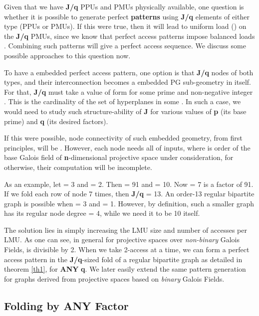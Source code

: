 \documentclass[12pt]{article}
\begin{document}
Given that we have \textbf{J/q} PPUs and PMUs physically available, one
question is whether it is possible to generate perfect
\textbf{patterns} using \textbf{J/q} elements of either type (PPUs or PMUs). If this were true, then it will lead to uniform
load () on the \textbf{J/q} PMUs, since we know that perfect access patterns
impose balanced loads \cite{karm1}. Combining such patterns
will give a perfect access sequence. We discuss some possible
approaches to this question now.

To have a embedded perfect access pattern, one option is that \textbf{J/q} nodes of both
types, and their interconnection becomes a embedded PG sub-geometry in
itself. For that, 
\textbf{J/q} must take a value of
form {\large } for some
prime {\normalsize } and non-negative integer {\normalsize }. This
is the cardinality of the set of hyperplanes in some
{\large }. In such
a case, we would need to study such structure-ability of \textbf{J} for
various values of \textbf{p} (its base prime) and \textbf{q} (its desired
factors).

If this were possible, node connectivity of such embedded geometry, from first principles,
will be {\large }
\cite{karm1}. However, each node needs all of {\large
}
inputs, where  is order of the base Galois field of {\normalsize
\textbf{n}}-dimensional projective space
under consideration, for otherwise, their computation will be incomplete.

As an example, let  = 3 and  = 2. Then 
= 91 and {\normalsize } = 10.
Now  = 7 is a factor of 91. If we fold each row of node 7 times, then
\textbf{J/q} = 13. An order-13 regular bipartite graph is possible when
 = 3 and  = 1. However, by definition, such a smaller graph has
its regular node degree  = 4, while we need it to be 10 itself.

The solution lies in simply increasing the
LMU size and number of accesses per
LMU.  As one can see, in general for projective spaces over
\textit{non-binary} Galois Fields,  is divisible by 2. When we take
2-access at a time, we can form a perfect access pattern in the \textbf{J/q}-sized
fold of a regular bipartite graph as detailed in theorem \ref{th1}, for
\textbf{ANY} \textbf{q}. We
later easily extend the same pattern generation for graphs derived from
projective spaces based on \textit{binary} Galois Fields.

\subsection{Folding by \textbf{ANY} Factor}
\label{any_fold_sec}
\end{document}

